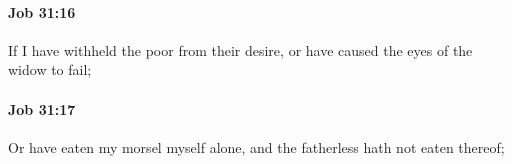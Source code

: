 		\paragraph{Job 31:16} %
			\label{JOB-31-16}

			If I have withheld the poor from their desire, or have caused the eyes of the widow to fail;


		\paragraph{Job 31:17} %
			\label{JOB-31-17}

			Or have eaten my morsel myself alone, and the fatherless hath not eaten thereof;


